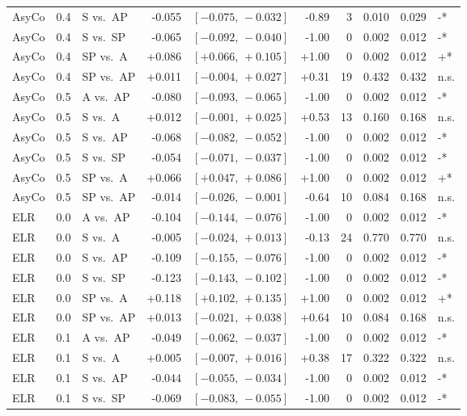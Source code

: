 \begin{landscape}
\begin{scriptsize}
\begin{longtable}{lllrrrrrrl}
AsyCo & 0.4 & S vs.\ AP & -0.055 & $[-0.075,\,-0.032]$ & -0.89 & 3 & 0.010 & 0.029 & -* \\
AsyCo & 0.4 & S vs.\ SP & -0.065 & $[-0.092,\,-0.040]$ & -1.00 & 0 & 0.002 & 0.012 & -* \\
AsyCo & 0.4 & SP vs.\ A & +0.086 & $[+0.066,\,+0.105]$ & +1.00 & 0 & 0.002 & 0.012 & +* \\
AsyCo & 0.4 & SP vs.\ AP & +0.011 & $[-0.004,\,+0.027]$ & +0.31 & 19 & 0.432 & 0.432 & n.s. \\
AsyCo & 0.5 & A vs.\ AP & -0.080 & $[-0.093,\,-0.065]$ & -1.00 & 0 & 0.002 & 0.012 & -* \\
AsyCo & 0.5 & S vs.\ A & +0.012 & $[-0.001,\,+0.025]$ & +0.53 & 13 & 0.160 & 0.168 & n.s. \\
AsyCo & 0.5 & S vs.\ AP & -0.068 & $[-0.082,\,-0.052]$ & -1.00 & 0 & 0.002 & 0.012 & -* \\
AsyCo & 0.5 & S vs.\ SP & -0.054 & $[-0.071,\,-0.037]$ & -1.00 & 0 & 0.002 & 0.012 & -* \\
AsyCo & 0.5 & SP vs.\ A & +0.066 & $[+0.047,\,+0.086]$ & +1.00 & 0 & 0.002 & 0.012 & +* \\
AsyCo & 0.5 & SP vs.\ AP & -0.014 & $[-0.026,\,-0.001]$ & -0.64 & 10 & 0.084 & 0.168 & n.s. \\
ELR & 0.0 & A vs.\ AP & -0.104 & $[-0.144,\,-0.076]$ & -1.00 & 0 & 0.002 & 0.012 & -* \\
ELR & 0.0 & S vs.\ A & -0.005 & $[-0.024,\,+0.013]$ & -0.13 & 24 & 0.770 & 0.770 & n.s. \\
ELR & 0.0 & S vs.\ AP & -0.109 & $[-0.155,\,-0.076]$ & -1.00 & 0 & 0.002 & 0.012 & -* \\
ELR & 0.0 & S vs.\ SP & -0.123 & $[-0.143,\,-0.102]$ & -1.00 & 0 & 0.002 & 0.012 & -* \\
ELR & 0.0 & SP vs.\ A & +0.118 & $[+0.102,\,+0.135]$ & +1.00 & 0 & 0.002 & 0.012 & +* \\
ELR & 0.0 & SP vs.\ AP & +0.013 & $[-0.021,\,+0.038]$ & +0.64 & 10 & 0.084 & 0.168 & n.s. \\
ELR & 0.1 & A vs.\ AP & -0.049 & $[-0.062,\,-0.037]$ & -1.00 & 0 & 0.002 & 0.012 & -* \\
ELR & 0.1 & S vs.\ A & +0.005 & $[-0.007,\,+0.016]$ & +0.38 & 17 & 0.322 & 0.322 & n.s. \\
ELR & 0.1 & S vs.\ AP & -0.044 & $[-0.055,\,-0.034]$ & -1.00 & 0 & 0.002 & 0.012 & -* \\
ELR & 0.1 & S vs.\ SP & -0.069 & $[-0.083,\,-0.055]$ & -1.00 & 0 & 0.002 & 0.012 & -* \\

\end{longtable}
\end{scriptsize}
\end{landscape}
